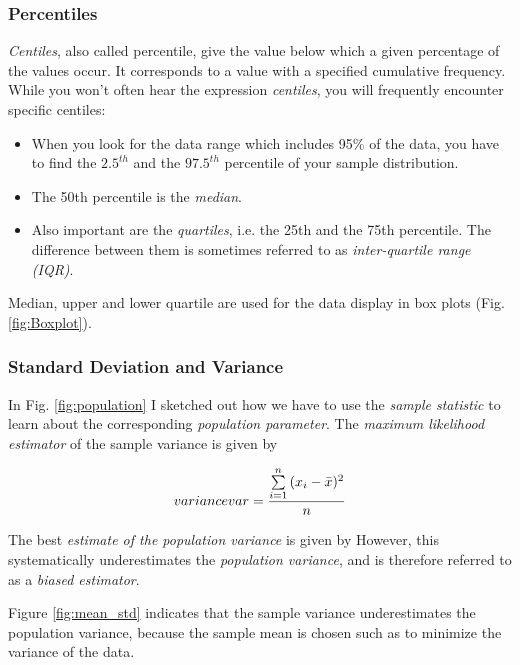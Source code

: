 \subsubsection{Percentiles}

\emph{Centiles}, also called \gls{percentile}, give the value below which a given percentage of the values occur. It corresponds to a value with a specified cumulative frequency. While you won't often hear the expression \emph{centiles}, you will frequently encounter specific centiles:

\begin{itemize}
  \item When you look for the data range which includes 95\% of the data, you have to find the $2.5^{th}$ and the $97.5^{th}$ percentile of your sample distribution.
  \item The 50th percentile is the \emph{median}.
  \item Also important are the \emph{quartiles}, i.e. the 25th and the 75th percentile. The difference between them is sometimes referred to as \emph{inter-quartile range (IQR)}.
\end{itemize}

Median, upper and lower quartile are used for the data display in box plots (Fig.\ref{fig:Boxplot}).

\subsubsection{Standard Deviation and Variance}

In Fig. \ref{fig:population} I sketched out how we have to use the \emph{sample statistic} to learn about the corresponding \emph{population parameter}.
The \emph{maximum likelihood estimator} of the sample \gls{variance} is given by

\begin{equation}\label{eq_variance} \index{general}{variance}
  var = \frac{{\sum\limits_{i = 1}^n {({x_i-\bar{x}})^2} }}{n}
\end{equation}

The best \emph{estimate of the population variance} is given by
However, this systematically underestimates the \emph{population variance}, and is therefore referred to as a \emph{biased estimator}.

Figure \ref{fig:mean_std} indicates that the sample variance underestimates the population variance, because the sample mean is chosen such as to minimize the variance of the data.

